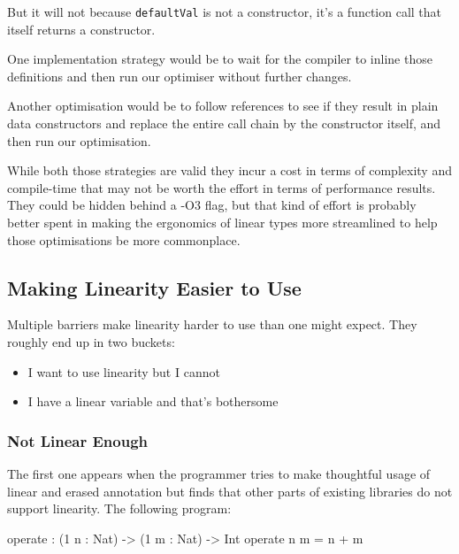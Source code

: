 \documentclass[
]{article}
\newenvironment{Shaded}{}{}
\newcommand{\DataTypeTok}[1]{\textcolor[rgb]{0.56,0.13,0.00}{#1}}
\newcommand{\DecValTok}[1]{\textcolor[rgb]{0.25,0.63,0.44}{#1}}
\newcommand{\NormalTok}[1]{#1}
\newcommand{\OperatorTok}[1]{\textcolor[rgb]{0.40,0.40,0.40}{#1}}
\newcommand{\OtherTok}[1]{\textcolor[rgb]{0.00,0.44,0.13}{#1}}
\providecommand{\tightlist}{%
  \setlength{\itemsep}{0pt}\setlength{\parskip}{0pt}}
\begin{document}
But it will not because \texttt{defaultVal} is not a constructor, it's a
function call that itself returns a constructor.

One implementation strategy would be to wait for the compiler to inline
those definitions and then run our optimiser without further changes.

Another optimisation would be to follow references to see if they result
in plain data constructors and replace the entire call chain by the
constructor itself, and then run our optimisation.

While both those strategies are valid they incur a cost in terms of
complexity and compile-time that may not be worth the effort in terms of
performance results. They could be hidden behind a -O3 flag, but that
kind of effort is probably better spent in making the ergonomics of
linear types more streamlined to help those optimisations be more
commonplace.

\hypertarget{making-linearity-easier-to-use}{%
\subsection{Making Linearity Easier to
Use}\label{making-linearity-easier-to-use}}

Multiple barriers make linearity harder to use than one might expect.
They roughly end up in two buckets:

\begin{itemize}
\tightlist
\item
  I want to use linearity but I cannot
\item
  I have a linear variable and that's bothersome
\end{itemize}

\hypertarget{not-linear-enough}{%
\subsubsection{Not Linear Enough}\label{not-linear-enough}}

The first one appears when the programmer tries to make thoughtful usage
of linear and erased annotation but finds that other parts of existing
libraries do not support linearity. The following program:

\begin{Shaded}
\begin{Highlighting}[]
\NormalTok{operate }\OperatorTok{:}\NormalTok{ (}\DecValTok{1}\NormalTok{ n }\OperatorTok{:} \DataTypeTok{Nat}\NormalTok{) }\OtherTok{{-}\textgreater{}}\NormalTok{ (}\DecValTok{1}\NormalTok{ m }\OperatorTok{:} \DataTypeTok{Nat}\NormalTok{) }\OtherTok{{-}\textgreater{}} \DataTypeTok{Int}
\NormalTok{operate n m }\OtherTok{=}\NormalTok{ n }\OperatorTok{+}\NormalTok{ m}
\end{Highlighting}
\end{Shaded}
\end{document}
